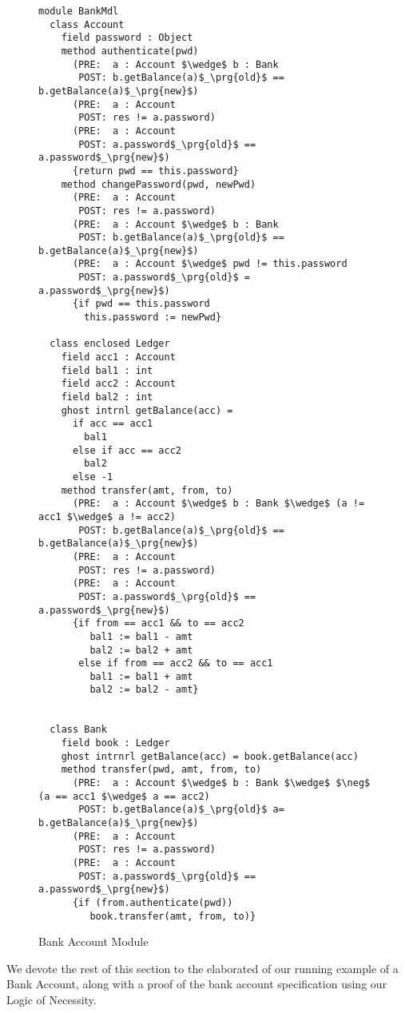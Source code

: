 \begin{figure}[t]
\begin{lstlisting}[mathescape=true, frame=lines, language=chainmail]
module BankMdl
  class Account
    field password : Object
    method authenticate(pwd)
      (PRE:  a : Account $\wedge$ b : Bank
       POST: b.getBalance(a)$_\prg{old}$ == b.getBalance(a)$_\prg{new}$)
      (PRE:  a : Account
       POST: res != a.password)
      (PRE:  a : Account
       POST: a.password$_\prg{old}$ == a.password$_\prg{new}$)
      {return pwd == this.password}
    method changePassword(pwd, newPwd)
      (PRE:  a : Account
       POST: res != a.password)
      (PRE:  a : Account $\wedge$ b : Bank
       POST: b.getBalance(a)$_\prg{old}$ == b.getBalance(a)$_\prg{new}$)
      (PRE:  a : Account $\wedge$ pwd != this.password
       POST: a.password$_\prg{old}$ = a.password$_\prg{new}$)
      {if pwd == this.password
        this.password := newPwd}

  class enclosed Ledger
    field acc1 : Account
    field bal1 : int
    field acc2 : Account
    field bal2 : int
    ghost intrnl getBalance(acc) = 
      if acc == acc1
        bal1
      else if acc == acc2
        bal2
      else -1
    method transfer(amt, from, to)
      (PRE:  a : Account $\wedge$ b : Bank $\wedge$ (a != acc1 $\wedge$ a != acc2)
       POST: b.getBalance(a)$_\prg{old}$ == b.getBalance(a)$_\prg{new}$)
      (PRE:  a : Account
       POST: res != a.password)
      (PRE:  a : Account
       POST: a.password$_\prg{old}$ == a.password$_\prg{new}$)
      {if from == acc1 && to == acc2
         bal1 := bal1 - amt
         bal2 := bal2 + amt
       else if from == acc2 && to == acc1
         bal1 := bal1 + amt
         bal2 := bal2 - amt}
      

  class Bank
    field book : Ledger
    ghost intrnrl getBalance(acc) = book.getBalance(acc)
    method transfer(pwd, amt, from, to)
      (PRE:  a : Account $\wedge$ b : Bank $\wedge$ $\neg$ (a == acc1 $\wedge$ a == acc2)
       POST: b.getBalance(a)$_\prg{old}$ a= b.getBalance(a)$_\prg{new}$)
      (PRE:  a : Account
       POST: res != a.password)
      (PRE:  a : Account
       POST: a.password$_\prg{old}$ == a.password$_\prg{new}$)
      {if (from.authenticate(pwd))
         book.transfer(amt, from, to)}
\end{lstlisting}
\caption{Bank Account Module}
\label{f:ex-bank}
\end{figure}
We devote the rest of this section to the elaborated of our
running example of a Bank Account, along with a proof 
of the bank account specification using our Logic of Necessity.

